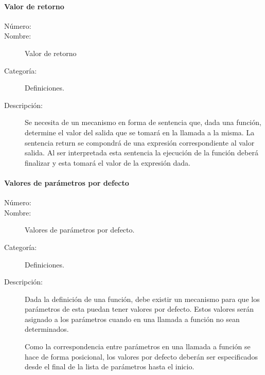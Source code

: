 \paragraph{Valor de retorno}
\begin{framed}
	\begin{description}
		\item [Número:] \cn
		\item [Nombre:] Valor de retorno
		\item [Categoría:] Definiciones.
		\item [Descripción:] Se necesita de un mecanismo en forma de sentencia que, dada una función, determine
		el valor del salida que se tomará en la llamada a la misma. La sentencia return se compondrá de una 
		expresión correspondiente al valor salida. Al ser interpretada esta sentencia la ejecución de
		la función deberá finalizar y esta tomará el valor de la expresión dada.
	\end{description}
\end{framed}

\paragraph{Valores de parámetros por defecto}
\begin{framed}
	\begin{description}
		\item [Número:] \cn
		\item [Nombre:] Valores de parámetros por defecto.
		\item [Categoría:] Definiciones.
		\item [Descripción:] Dada la definición de una función, debe existir un mecanismo para que los parámetros de esta puedan tener 
		valores por defecto. Estos valores serán asignado a los parámetros cuando en una llamada a función no sean determinados. 
		
		Como la correspondencia entre parámetros en una llamada a función se hace de forma posicional, los valores por defecto deberán ser especificados 
		desde el final de la lista de parámetros hasta el inicio.
	\end{description}
\end{framed}

